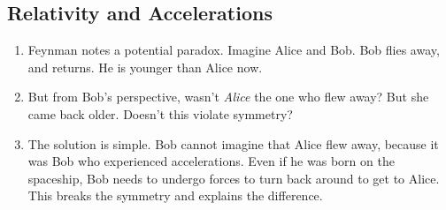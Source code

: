 \subsection{Relativity and Accelerations}

\begin{enumerate}

  \item Feynman notes a potential paradox. Imagine Alice and Bob. Bob
  flies away, and returns. He is younger than Alice now.

  \item But from Bob's perspective, wasn't \emph{Alice} the one who flew
  away? But she came back older. Doesn't this violate symmetry?

  \item The solution is simple. Bob cannot imagine that Alice flew away,
  because it was Bob who experienced accelerations. Even if he was born
  on the spaceship, Bob needs to undergo forces to turn back around to
  get to Alice. This breaks the symmetry and explains the difference.

\end{enumerate}
